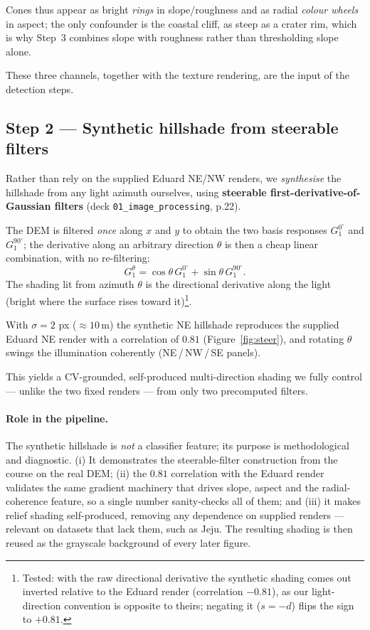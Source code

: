 \documentclass[11pt]{article}
\begin{document}
Cones thus appear as bright \emph{rings} in slope/roughness and as radial \emph{colour
wheels} in aspect; the only confounder is the coastal cliff, as steep as a crater rim, which
is why Step~3 combines slope with roughness rather than thresholding slope alone.

These three channels, together with the texture rendering, are the input of the detection
steps.

\subsection{Step 2 --- Synthetic hillshade from steerable filters}
Rather than rely on the supplied Eduard NE/NW renders, we \emph{synthesise} the hillshade from
any light azimuth ourselves, using \textbf{steerable first-derivative-of-Gaussian filters}
(deck \texttt{01\_image\_processing}, p.22).

The DEM is filtered \emph{once} along $x$ and $y$ to obtain the two basis responses
$G_1^{0^\circ}$ and $G_1^{90^\circ}$; the derivative along an arbitrary direction $\theta$ is
then a cheap linear combination, with no re-filtering:
\begin{equation}
G_1^{\theta} = \cos\theta\,G_1^{0^\circ} + \sin\theta\,G_1^{90^\circ}.
\end{equation}
The shading lit from azimuth $\theta$ is the directional derivative along the light (bright
where the surface rises toward it)\footnote{Tested: with the raw directional derivative the
synthetic shading comes out inverted relative to the Eduard render (correlation $-0.81$), as
our light-direction convention is opposite to theirs; negating it ($s=-d$) flips the sign to
$+0.81$.}.

With $\sigma=2$ px ($\approx 10$\,m) the synthetic NE hillshade reproduces the supplied Eduard
NE render with a correlation of $0.81$ (Figure~\ref{fig:steer}), and rotating $\theta$ swings
the illumination coherently (NE\,/\,NW\,/\,SE panels).

This yields a CV-grounded, self-produced multi-direction shading we fully control --- unlike
the two fixed renders --- from only two precomputed filters.

\paragraph{Role in the pipeline.} The synthetic hillshade is \emph{not} a classifier feature;
its purpose is methodological and diagnostic. (i) It demonstrates the steerable-filter
construction from the course on the real DEM; (ii) the $0.81$ correlation with the Eduard
render validates the same gradient machinery that drives slope, aspect and the radial-coherence
feature, so a single number sanity-checks all of them; and (iii) it makes relief shading
self-produced, removing any dependence on supplied renders --- relevant on datasets that lack
them, such as Jeju. The resulting shading is then reused as the grayscale background of every
later figure.
\end{document}
